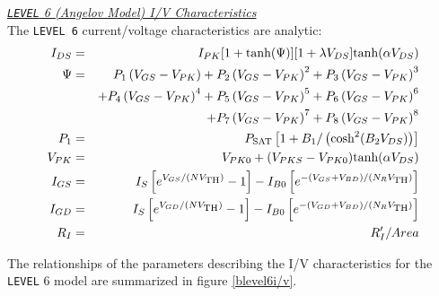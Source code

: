 \noindent\underline{\sl {\tt LEVEL} 6 (Angelov Model)
I/V Characteristics}\\[0.1in]
The {\tt LEVEL 6} current/voltage characteristics are analytic:
\begin{eqnarray}
I_{DS}&=& I_{PK} [ 1 + \mbox{tanh}(\Psi)]
                 [ 1 + \lambda V_{DS}]
                 \mbox{tanh}(\alpha V_{DS}) \\
\Psi  &=& P_1 \left(V_{GS} - V_{PK} \right)
        + P_2 \left(V_{GS} - V_{PK} \right) ^2
        + P_3 \left(V_{GS} - V_{PK} \right) ^3 \nonumber\\
     && + P_4 \left(V_{GS} - V_{PK} \right) ^4
        + P_5 \left(V_{GS} - V_{PK} \right) ^5
        + P_6 \left(V_{GS} - V_{PK} \right) ^6\nonumber\\
     && + P_7 \left(V_{GS} - V_{PK} \right) ^7
        + P_8 \left(V_{GS} - V_{PK} \right) ^8
    \\
P_1 &=& P_{\mbox{\scriptsize SAT}}
       \left[ 1 + B_1/\left(\mbox{cosh}^2(B_2 V_{DS}) \right)\right]\\
V_{PK} &=& V_{PK0} + (V_{PKS}-V_{PK0}) \mbox{tanh}(\alpha V_{DS})\\
I_{GS}&=&I_S \left[ e^{V_{GS}/(N V_{\mbox{\scriptsize TH}})} -1 \right]
         - I_{B0} \left[ e^{-(V_{GS}+ V_{BD})/(N_R V_{\mbox{\scriptsize TH}})}  \right]
      \label{b6igs} \\
I_{GD}&=&I_S \left[ e^{V_{GD}/(N V_{\mbox{\scriptsize TH}})} -1 \right]
         - I_{B0} \left[ e^{-(V_{GD}+ V_{BD})/(N_R V_{\mbox{\scriptsize TH}})}  \right]
      \label{b6igd} \\
      R_I &=& R'_I/Area
\end{eqnarray}

The relationships of the parameters describing the I/V
characteristics for the {\tt LEVEL} 6 model are summarized in figure
\ref{blevel6i/v}.

\medskip

